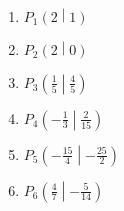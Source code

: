 \begin{Answer}[ref=schnittpunktA1]\\
	\begin{minipage}{0.5\textwidth}
		\begin{enumerate}[label=\alph*)]
			\item \(P_1\left(2\middle\vert 1\right)\)
			\item \(P_2\left(2\middle\vert 0\right)\)
			\item \(P_3\left(\frac{1}{5}\middle\vert \frac{4}{5}\right)\)
		\end{enumerate}
	\end{minipage}%
	\begin{minipage}{0.5\textwidth}
		\begin{enumerate}[label=\alph*)]
			\setcounter{enumi}{3}
			\item \(P_4\left(-\frac{1}{3}\middle\vert \frac{2}{15}\right)\)
			\item \(P_5\left(-\frac{15}{4}\middle\vert -\frac{25}{2}\right)\)
			\item \(P_6\left(\frac{4}{7}\middle\vert -\frac{5}{14}\right)\)
		\end{enumerate}
	\end{minipage}%
\end{Answer}